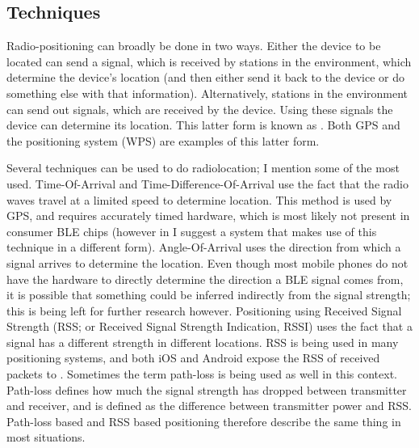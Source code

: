 \subsection{Techniques}
Radio-positioning can broadly be done in two ways.
Either the device to be located can send a signal, which is received by stations in the environment, which determine the device's location (and then either send it back to the device or do something else with that information).
Alternatively, stations in the environment can send out signals, which are received by the device.
Using these signals the device can determine its location.
This latter form is known as .
Both GPS and the \wifi positioning system (WPS) are examples of this latter form.

Several techniques can be used to do radiolocation; I mention some of the most used.
Time-Of-Arrival and Time-Difference-Of-Arrival use the fact that the radio waves travel at a limited speed to determine location.
This method is used by GPS, and requires accurately timed hardware, which is most likely not present in consumer BLE chips (however in  I suggest a system that makes use of this technique in a different form).
Angle-Of-Arrival uses the direction from which a signal arrives to determine the location.
Even though most mobile phones do not have the hardware to directly determine the direction a BLE signal comes from, it is possible that something could be inferred indirectly from the signal strength; this is being left for further research however.
Positioning using Received Signal Strength (RSS; or Received Signal Strength Indication, RSSI) uses the fact that a signal has a different strength in different locations.
RSS is being used in many \wifi positioning systems, and both iOS and Android expose the RSS of received packets to \apps.
Sometimes the term path-loss is being used as well in this context.
Path-loss defines how much the signal strength has dropped between transmitter and receiver, and is defined as the difference between transmitter power and RSS.
Path-loss based and RSS based positioning therefore describe the same thing in most situations.


